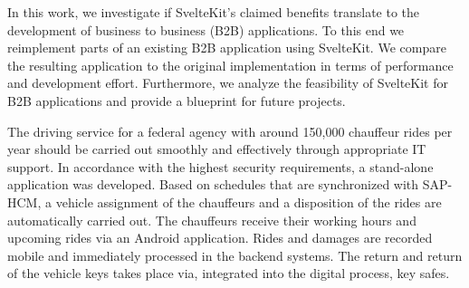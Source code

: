 \documentclass[
a4paper, 
DIV=15, 
headsepline, 
numbers=noenddot,
bibliography=totoc,
BCOR=15mm,
leqno,
]{scrarticle}
\begin{document}
In this work, we investigate if SvelteKit's claimed benefits translate to the development of business to business (B2B) applications. To this end we reimplement parts of an existing B2B application using SvelteKit. We compare the resulting application to the original implementation in terms of performance and development effort. Furthermore, we analyze the feasibility of SvelteKit for B2B applications and provide a blueprint for future projects.




The driving service for a federal agency with around 150,000 chauffeur rides per year should be carried out smoothly and effectively through appropriate IT support. In accordance with the highest security requirements, a stand-alone application was developed. Based on schedules that are synchronized with SAP-HCM, a vehicle assignment of the chauffeurs and a disposition of the rides are automatically carried out. The chauffeurs receive their working hours and upcoming rides via an Android application. Rides and damages are recorded mobile and immediately processed in the backend systems. The return and return of the vehicle keys takes place via, integrated into the digital process, key safes. 
\end{document}
